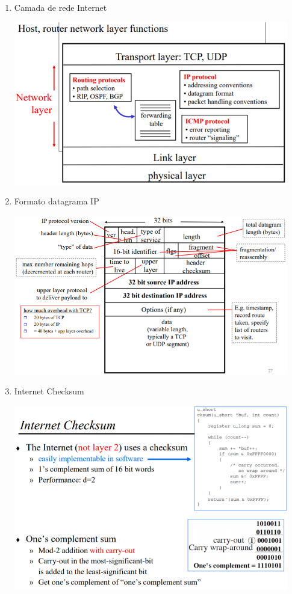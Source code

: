 \documentclass{article}
\begin{document}
\begin{enumerate}
    \item Camada de rede Internet
        \begin{center}
            \includegraphics[width=12cm]{images/RCOM11.png}
        \end{center}
    \item Formato datagrama IP
        \begin{center}
            \includegraphics[width=12cm]{images/RCOM12.png}
        \end{center}
    \item Internet Checksum
        \begin{center}
            \includegraphics[width=12cm]{images/RCOM13.png}
        \end{center}
\end{enumerate}
\end{document}
